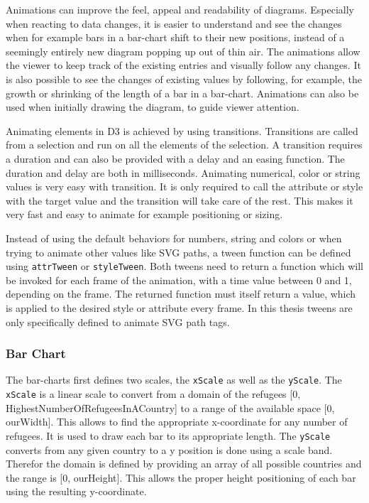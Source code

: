 Animations can improve the feel, appeal and readability of diagrams. Especially when reacting to data changes, it is easier to understand and see the changes when for example bars in a bar-chart shift to their new positions, instead of a seemingly entirely new diagram popping up out of thin air. The animations allow the viewer to keep track of the existing entries and visually follow any changes. It is also possible to see the changes of existing values by following, for example, the growth or shrinking of the length of a bar in a bar-chart. Animations can also be used when initially drawing the diagram, to guide viewer attention.

Animating elements in D3 is achieved by using transitions. Transitions are called from a selection and run on all the elements of the selection. A transition requires a duration and can also be provided with a delay and an easing function. The duration and delay are both in milliseconds. Animating numerical, color or string values is very easy with transition. It is only required to call the attribute or style with the target value and the transition will take care of the rest. This makes it very fast and easy to animate for example positioning or sizing.

Instead of using the default behaviors for numbers, string and colors or when trying to animate other values like SVG paths, a tween function can be defined using \verb|attrTween| or \verb|styleTween|. Both tweens need to return a function which will be invoked for each frame of the animation, with a time value between 0 and 1, depending on the frame. The returned function must itself return a value, which is applied to the desired style or attribute every frame. In this thesis tweens are only specifically defined to animate SVG path tags.


\subsubsection{Bar Chart}
The bar-charts first defines two scales, the \texttt{xScale} as well as the \texttt{yScale}. The \texttt{xScale} is a linear scale to convert from a domain of the refugees [0, HighestNumberOfRefugeesInACountry] to a range of the available space [0, ourWidth]. This allows to find the appropriate x-coordinate for any number of refugees. It is used to draw each bar to its appropriate length. The \texttt{yScale} converts from any given country to a y position is done using a scale band. Therefor the domain is defined by providing an array of all possible countries and the range is [0, ourHeight]. This allows the proper height positioning of each bar using the resulting y-coordinate.

